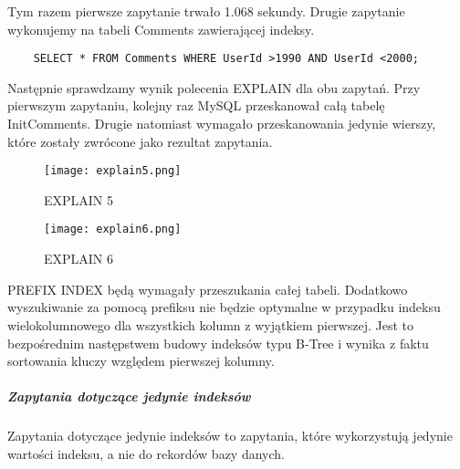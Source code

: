 Tym razem pierwsze zapytanie trwało 1.068 sekundy. Drugie zapytanie wykonujemy na tabeli Comments zawierającej indeksy.
\begin{verbatim}
    SELECT * FROM Comments WHERE UserId >1990 AND UserId <2000;
\end{verbatim}
Następnie sprawdzamy wynik polecenia EXPLAIN dla obu zapytań. Przy pierwszym zapytaniu, kolejny raz MySQL przeskanował całą tabelę Init\textunderscore Comments. Drugie natomiast wymagało przeskanowania jedynie wierszy, które zostały zwrócone jako rezultat zapytania.

\begin{figure}[h]
    \texttt{[image: explain5.png]} 
    \caption{EXPLAIN 5}
\end{figure}

\begin{figure}[h]
    \texttt{[image: explain6.png]} 
    \caption{EXPLAIN 6}
\end{figure}


PREFIX INDEX
będą wymagały przeszukania całej tabeli. Dodatkowo wyszukiwanie za pomocą prefiksu nie będzie optymalne w przypadku indeksu wielokolumnowego dla wszystkich kolumn z wyjątkiem pierwszej. Jest to bezpośrednim następstwem budowy indeksów typu B-Tree i wynika z faktu sortowania kluczy względem pierwszej kolumny.





\subparagraph{Zapytania dotyczące jedynie indeksów}\mbox{}
Zapytania dotyczące jedynie indeksów to zapytania, które wykorzystują jedynie wartości indeksu, a nie do rekordów bazy danych.





